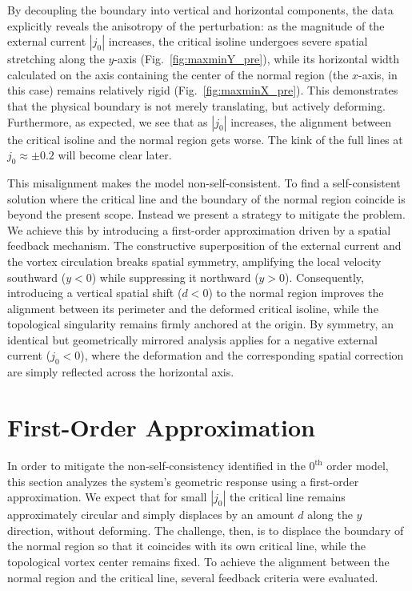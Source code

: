 \documentclass[english,binding=0.6cm,noexaminfo]{sapthesis}
\begin{document}
By decoupling the boundary into vertical and horizontal components, the data explicitly reveals the anisotropy of the perturbation: as the magnitude of the external current $|j_0|$ increases, the critical isoline undergoes severe spatial stretching along the $y$-axis (Fig.~\ref{fig:maxminY_pre}), while its horizontal width calculated on the axis containing the center of the normal region (the $x$-axis, in this case) remains relatively rigid (Fig.~\ref{fig:maxminX_pre}). This demonstrates that the physical boundary is not merely translating, but actively deforming. Furthermore, as expected, we see that as $|j_0|$ increases, the alignment between the critical isoline and the normal region gets worse. The kink of the full lines at $j_0\approx\pm0.2$ will become clear later.

This misalignment makes the model non-self-consistent. To find a self-consistent solution where the critical line and the boundary of the normal region coincide is beyond the present scope. Instead we present a strategy to mitigate the problem. We achieve this by introducing a first-order approximation driven by a spatial feedback mechanism. The constructive superposition of the external current and the vortex circulation breaks spatial symmetry, amplifying the local velocity southward ($y < 0$) while suppressing it northward ($y > 0$). Consequently, introducing a vertical spatial shift ($d < 0$) to the normal region improves the alignment between its perimeter and the deformed critical isoline, while the topological singularity remains firmly anchored at the origin. By symmetry, an identical but geometrically mirrored analysis applies for a negative external current ($j_0 < 0$), where the deformation and the corresponding spatial correction are simply reflected across the horizontal axis.

\section{First-Order Approximation}
\label{sec:sv_first}
In order to mitigate the non-self-consistency identified in the $0^{\text{th}}$ order model, this section analyzes the system's geometric response using a first-order approximation. We expect that for small $|j_0|$ the critical line remains approximately circular and simply displaces by an amount $d$ along the $y$ direction, without deforming. The challenge, then, is to displace the boundary of the normal region so that it coincides with its own critical line, while the topological vortex center remains fixed. To achieve the alignment between the normal region and the critical line, several feedback criteria were evaluated. 
\end{document}
